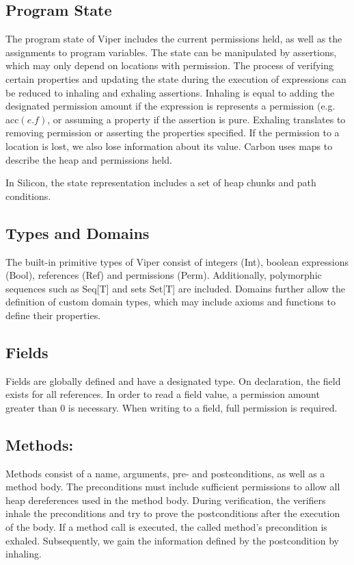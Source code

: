 \documentclass[12pt]{article}
\begin{document}
\subsection{Program State}
The program state of Viper includes the current permissions held, as well as the assignments to program variables. The state can be manipulated by assertions, which may only depend on locations with permission. The process of verifying certain properties and updating the state during the execution of expressions can be reduced to inhaling and exhaling assertions. Inhaling is equal to adding the designated permission amount if the expression is represents a permission (e.g. acc\((e.f)\), or assuming a property if the assertion is pure. Exhaling translates to removing permission or asserting the properties specified. If the permission to a location is lost, we also lose information about its value.
Carbon uses maps to describe the heap and permissions held. 

In Silicon, the state representation includes a set of heap chunks and path conditions.

\subsection{Types and Domains}
The built-in primitive types of Viper consist of integers (Int), boolean expressions (Bool), references (Ref) and permissions (Perm). Additionally,  polymorphic sequences such as Seq[T] and sets Set[T] are included. Domains further allow the definition of custom domain types, which may include axioms and functions to define their properties.

\subsection{Fields}
Fields are globally defined and have a designated type. On declaration, the field exists for all references. In order to read a field value, a permission amount greater than 0 is necessary. When writing to a field, full permission is required.

\subsection{Methods: }
Methods consist of a name, arguments, pre- and postconditions, as well as a method body. The preconditions must include sufficient permissions to allow all heap dereferences used in the method body. During verification, the verifiers inhale the preconditions and try to prove the postconditions after the execution of the body. If a method call is executed, the called method's precondition is exhaled. Subsequently, we gain the information defined by the postcondition by inhaling.
\end{document}
